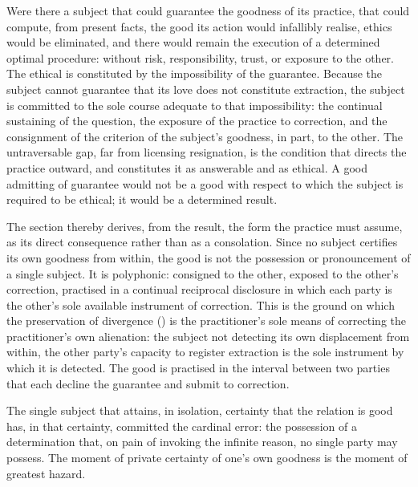 \begin{claim}
Were there a subject that could guarantee the goodness of its practice, that could compute, from present facts, the good its action would infallibly realise, ethics would be eliminated, and there would remain the execution of a determined optimal procedure: without risk, responsibility, trust, or exposure to the other. The ethical is constituted by the impossibility of the guarantee. Because the subject cannot guarantee that its love does not constitute extraction, the subject is committed to the sole course adequate to that impossibility: the continual sustaining of the question, the exposure of the practice to correction, and the consignment of the criterion of the subject's goodness, in part, to the other. The untraversable gap, far from licensing resignation, is the condition that directs the practice outward, and constitutes it as answerable and as ethical. A good admitting of guarantee would not be a good with respect to which the subject is required to be ethical; it would be a determined result.
\end{claim}

\noindent
The section thereby derives, from the result, the form the practice must assume, as its direct consequence rather than as a consolation. Since no subject certifies its own goodness from within, the good is not the possession or pronouncement of a single subject. It is polyphonic: consigned to the other, exposed to the other's correction, practised in a continual reciprocal disclosure in which each party is the other's sole available instrument of correction. This is the ground on which the preservation of divergence () is the practitioner's sole means of correcting the practitioner's own alienation: the subject not detecting its own displacement from within, the other party's capacity to register extraction is the sole instrument by which it is detected. The good is practised in the interval between two parties that each decline the guarantee and submit to correction.

\begin{claim}
The single subject that attains, in isolation, certainty that the relation is good has, in that certainty, committed the cardinal error: the possession of a determination that, on pain of invoking the infinite reason, no single party may possess. The moment of private certainty of one's own goodness is the moment of greatest hazard.
\end{claim}

